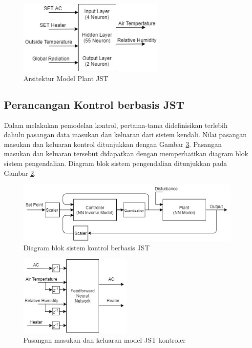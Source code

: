 \begin{figure}[!h]
	\centering
	\includegraphics[width=0.65\textwidth]{figures/NNPlantModelDesign}
	\caption{Arsitektur Model Plant JST}
	\label{fig:4:NNPlantModelDesign}
\end{figure}


\subsection{Perancangan Kontrol berbasis JST}

Dalam melakukan pemodelan kontrol, pertama-tama didefinisikan terlebih dahulu pasangan data masukan dan keluaran dari sistem kendali. Nilai pasangan masukan dan keluaran kontrol ditunjukkan dengan Gambar \ref{fig:4:NNControlIO}. Pasangan masukan dan keluaran tersebut didapatkan dengan memperhatikan diagram blok sistem pengendalian. Diagram blok sistem pengendalian ditunjukkan pada Gambar \ref{fig:4:ConstrolSystemBlockDiagram}.

\begin{figure}[!h]
	\centering
	\includegraphics[width=1\textwidth]{figures/ControlDesignDiagramII}
	\caption{Diagram blok sistem kontrol berbasis JST\cite{paper42Paisan}}
	\label{fig:4:ConstrolSystemBlockDiagram}
\end{figure}

\begin{figure}[!h]
	\centering
	\includegraphics[width=0.5\textwidth]{figures/NNControllerIO}
	\caption{Pasangan masukan dan keluaran model JST kontroler}
	\label{fig:4:NNControlIO}
\end{figure}


